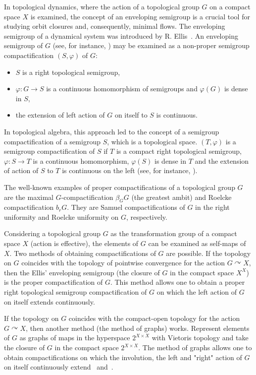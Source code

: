 \documentclass{amsart}
\begin{document}
In topological dynamics, where the action of a topological group $G$ on a compact space $X$ is examined, the concept of an enveloping semigroup is a crucial tool for studying orbit closures and, consequently, minimal flows. The enveloping semigroup of a dynamical system was introduced by R. Ellis~\cite{Ellis}. An enveloping semigroup of $G$ (see, for instance, \cite{Vries}) may be examined as a non-proper semigroup compactification $(S, \varphi)$ of $G$:  
\begin{itemize}
\item[(a)] $S$ is a right topological semigroup, 
\item [(b)] $\varphi: G\to S$ is a continuous homomorphism of semigroups and $\varphi (G)$ is dense in $S$, 
\item[(c)] the extension of left action of $G$ on itself to $S$ is continuous. 
\end{itemize}
In topological algebra, this approach led to the concept of a semigroup compactification of a semigroup $S$, which is a topological space. $(T, \varphi)$ is a semigroup compactification of $S$ if $T$ is a compact right topological semigroup, $\varphi: S\to T$ is a continuous homomorphism, $\varphi (S)$ is dense in $T$ and the extension of action of $S$ to $T$ is continuous on the left (see, for instance, \cite[Definition~4.7]{HS}).

The well-known examples of proper compactifications of a topological group $G$ are the maximal $G$-compactification $\beta_G G$ (the greatest ambit) and Roelcke compactification $b_r G$. They are Samuel compactifications of $G$ in the right uniformity and Roelcke uniformity on $G$, respectively.

\medskip

Considering a topological group $G$ as the transformation group of a compact space $X$ (action is effective), the elements of $G$ can be examined as self-maps of $X$. Two methods of obtaining compactifications of $G$ are possible. If the topology on $G$ coincides with the topology of pointwise convergence for the action 
$G\curvearrowright X$, then the Ellis' enveloping semigroup (the closure of $G$ in the compact space $X^X$) is the proper compactification of $G$. This method allows one to obtain a proper right topological semigroup compactification of $G$ on which the left action of $G$ on itself extends continuously. 

If the topology on $G$ coincides with the compact-open topology for the action $G\curvearrowright X$, then another method (the method of graphs) works. Represent elements of $G$ as graphs of maps in the hyperspace $2^{X\times X}$ with Vietoris topology and take the closure of $G$ in the compact space $2^{X\times X}$. The method of graphs allows one to obtain compactifications on which the involution,  the left and "right" action of $G$ on itself continuously extend~\cite{Kennedy} and~\cite{usp2001}.
\end{document}
